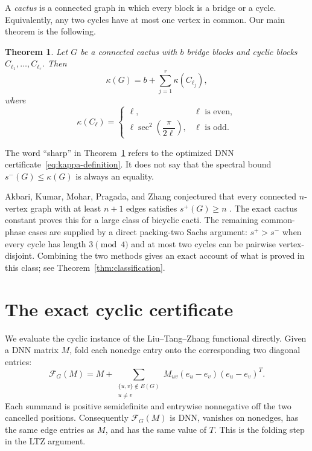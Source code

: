\documentclass[11pt]{article}
\newtheorem{theorem}{Theorem}[section]
\theoremstyle{remark}
\begin{document}
A \emph{cactus} is a connected graph in which every block is a bridge or a
cycle.  Equivalently, any two cycles have at most one vertex in common.  Our
main theorem is the following.

\begin{theorem}\label{thm:main}
Let $G$ be a connected cactus with $b$ bridge blocks and cyclic blocks
$C_{\ell_1},\ldots,C_{\ell_r}$.  Then
\begin{equation}\label{eq:main}
 \kappa(G)=b+\sum_{j=1}^r\kappa(C_{\ell_j}),
\end{equation}
where
\begin{equation}\label{eq:cycle-value}
 \kappa(C_\ell)=
 \begin{cases}
  \ell,&\ell\text{ is even},\\[2mm]
  \ell\sec^2\!\left(\dfrac{\pi}{2\ell}\right),
       &\ell\text{ is odd}.
 \end{cases}
\end{equation}
\end{theorem}

The word ``sharp'' in Theorem~\ref{thm:main} refers to the optimized DNN
certificate~\eqref{eq:kappa-definition}.  It does not say that the spectral
bound $s^-(G)\leq\kappa(G)$ is always an equality.

Akbari, Kumar, Mohar, Pragada, and Zhang conjectured that every connected
$n$-vertex graph with at least $n+1$ edges satisfies $s^+(G)\geq n$
\cite[Conjecture~1.2]{AKMPZ}.  The exact cactus constant proves this for a
large class of bicyclic cacti.  The remaining common-phase cases are supplied
by a direct packing-two Sachs argument: $s^+>s^-$ when every cycle has length
$3\pmod4$ and at most two cycles can be pairwise vertex-disjoint.  Combining
the two methods gives an exact account of what is proved in this class; see
Theorem~\ref{thm:classification}.

\section{The exact cyclic certificate}

We evaluate the cyclic instance of the Liu--Tang--Zhang functional directly.
Given a DNN matrix $M$, fold each
nonedge entry onto the corresponding two diagonal entries:
\begin{equation}\label{eq:folding}
 \mathcal F_G(M)=M+
 \sum_{\substack{\{u,v\}\notin E(G)\\u\ne v}}
 M_{uv}(e_u-e_v)(e_u-e_v)^T.
\end{equation}
Each summand is positive semidefinite and entrywise nonnegative off the two
cancelled positions.  Consequently $\mathcal F_G(M)$ is DNN, vanishes on
nonedges, has the same edge entries as $M$, and has the same value of $T$.
This is the folding step in the LTZ argument.
\end{document}

